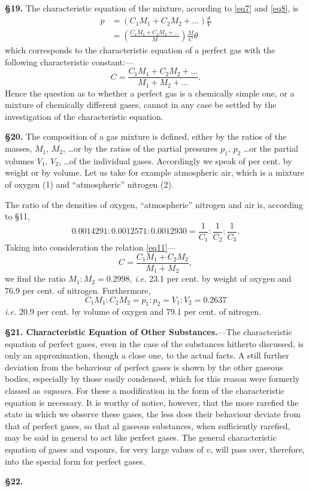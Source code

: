 \documentclass[oneside,12pt]{book}
\begin{document}
\textbf{\S 19.} The characteristic equation of the mixture, according to \eqref{eq7} and \eqref{eq8}, is 
\begin{align*}
    p&=(C_1M_1+C_2M_2+\dots)\frac{\theta}{V} \\
    &=\left(\frac{C_1M_1+C_2M_2+\dots}{M}\right)\frac{M}{C}\theta 
    \tag{10}
    \label{eq10}
\end{align*}
\setcounter{equation}{10}
which corresponds to the characteristic equation of a perfect gas with the following characteristic constant:---
\begin{equation}
    C=\frac{C_1M_1+C_2M_2+\dots}{M_1+M_2+\dots}. 
    \label{eq11}
\end{equation}
Hence the question as to whether a perfect gas is a chemically simple one, or a mixture of chemically different gases, cannot in any case be settled by the investigation of the characteristic equation. \par 

\textbf{\S 20.} The composition of a gas mixture is defined, either by the ratios of the masses, $M_1$, $M_2$, \dots or by the ratios of the partial pressures $p_1,\, p_2$ \dots or the partial volumes $V_1$, $V_2$, \dots of the individual gases. Accordingly we speak of per cent. by weight or by volume. Let us take for example atmospheric air, which is a mixture of oxygen (1) and ``atmospheric'' nitrogen (2). \par 

The ratio of the densities of oxygen, ``atmospheric'' nitrogen and air is, according to \S 11,
$$0.0014291:0.0012571:0.0012930=\frac{1}{C_1}:\frac{1}{C_2}:\frac{1}{C_3}.$$
Taking into consideration the relation \eqref{eq11}---
$$C=\frac{C_1M_1+C_2M_2}{M_1+M_2},$$
we find the ratio $M_1:M_2=0.2998$, \textit{i.e.} 23.1 per cent. by weight of oxygen and 76.9 per cent. of nitrogen. Furthermore, 
$$C_1M_1:C_2M_2=p_1:p_2=V_1:V_2=0.2637$$
\textit{i.e.} 20.9 per cent. by volume of oxygen and 79.1 per cent. of nitrogen. \par 

\textbf{\S 21. Characteristic Equation of Other Substances.}---The characteristic equation of perfect gases, even in the case of the substances hitherto discussed, is only an approximation, though a close one, to the actual facts. A still further deviation from the behaviour of perfect gases is shown by the other gaseous bodies, especially by those easily condensed, which for this reason were formerly classed as \textit{vapours}. For these a modification in the form of the characteristic equation is necessary. It is worthy of notice, however, that the more rarefied the state in which we observe these gases, the less does their behaviour deviate from that of perfect gases, so that al gaseous substances, when sufficiently rarefied, may be said in general to act like perfect gases. The general characteristic equation of gases and vapours, for very large values of $v$, will pass over, therefore, into the special form for perfect gases. \par 

\textbf{\S 22.}
\end{document}
